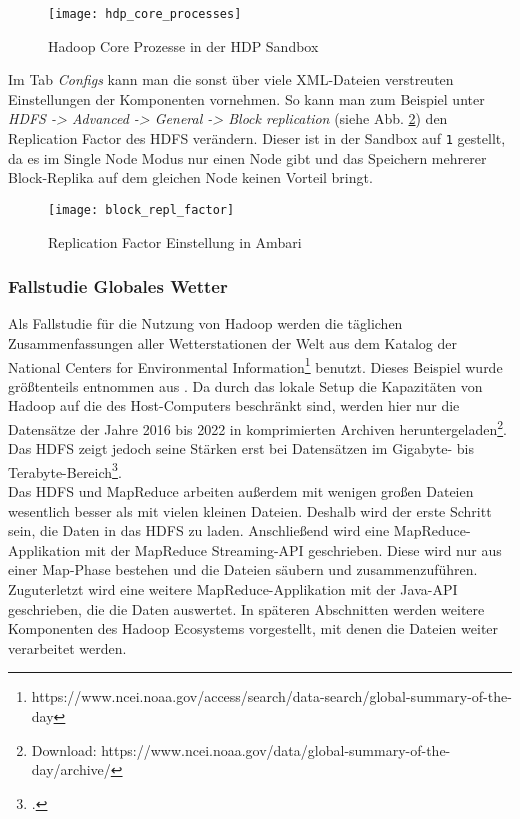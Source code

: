 \begin{figure}[ht]
    \centering
    \texttt{[image: hdp\_core\_processes]}
    \caption[Hadoop Core Prozesse in der HDP Sandbox]{Hadoop Core Prozesse in der HDP Sandbox}
    \label{fig:hdp core processes}
\end{figure}

Im Tab \textit{Configs} kann man die sonst über viele XML-Dateien verstreuten Einstellungen der Komponenten vornehmen. So kann man zum Beispiel unter \textit{HDFS -> Advanced -> General -> Block replication} (siehe Abb. \ref{fig:block replication factor}) den Replication Factor des HDFS verändern. Dieser ist in der Sandbox auf \verb|1| gestellt, da es im Single Node Modus nur einen Node gibt und das Speichern mehrerer Block-Replika auf dem gleichen Node keinen Vorteil bringt.  

\begin{figure}[ht]
    \centering
    \texttt{[image: block\_repl\_factor]}
    \caption[Replication Factor Einstellung in Ambari]{Replication Factor Einstellung in Ambari}
    \label{fig:block replication factor}
\end{figure}


\subsubsection*{Fallstudie Globales Wetter}
Als Fallstudie für die Nutzung von Hadoop werden die täglichen Zusammenfassungen aller Wetterstationen der Welt aus dem Katalog der National Centers for Environmental Information\footnote{https://www.ncei.noaa.gov/access/search/data-search/global-summary-of-the-day} benutzt. Dieses Beispiel wurde größtenteils entnommen aus . Da durch das lokale Setup die Kapazitäten von Hadoop auf die des Host-Computers beschränkt sind, werden hier nur die Datensätze der Jahre 2016 bis 2022 in komprimierten Archiven heruntergeladen\footnote{Download: https://www.ncei.noaa.gov/data/global-summary-of-the-day/archive/}. Das HDFS zeigt jedoch seine Stärken erst bei Datensätzen im Gigabyte- bis Terabyte-Bereich\footcite[vgl.][Assumptions and Goals -> Large Data Sets]{noauthor_apache_nodate-1}.\\
Das HDFS und MapReduce arbeiten außerdem mit wenigen großen Dateien wesentlich besser als mit vielen kleinen Dateien. Deshalb wird der erste Schritt sein, die Daten in das HDFS zu laden. Anschließend wird eine MapReduce-Applikation mit der MapReduce Streaming-API geschrieben. Diese wird nur aus einer Map-Phase bestehen und die Dateien säubern und zusammenzuführen. Zuguterletzt wird eine weitere MapReduce-Applikation mit der Java-API geschrieben, die die Daten auswertet. In späteren Abschnitten werden weitere Komponenten des Hadoop Ecosystems vorgestellt, mit denen die Dateien weiter verarbeitet werden.
